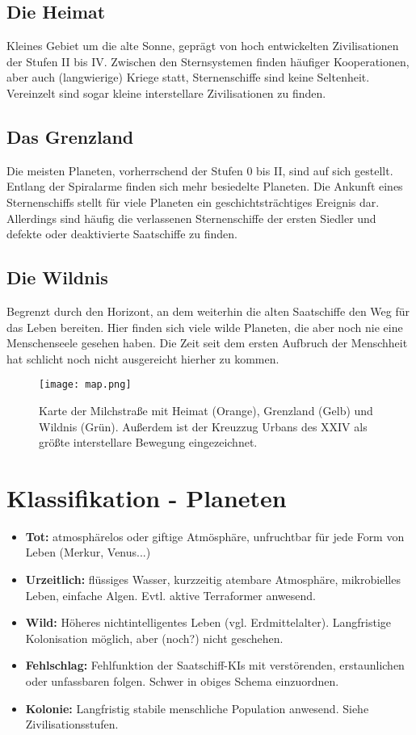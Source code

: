 \documentclass[10pt,a4paper]{report}
\begin{document}
\subsection*{Die Heimat}
Kleines Gebiet um die alte Sonne, geprägt von hoch entwickelten Zivilisationen der Stufen II bis IV. Zwischen den Sternsystemen finden häufiger Kooperationen, aber auch (langwierige) Kriege statt, Sternenschiffe sind keine Seltenheit. Vereinzelt sind sogar kleine interstellare Zivilisationen zu finden.
\subsection*{Das Grenzland}
Die meisten Planeten, vorherrschend der Stufen 0 bis II, sind auf sich gestellt. Entlang der Spiralarme finden sich mehr besiedelte Planeten. Die Ankunft eines Sternenschiffs stellt für viele Planeten ein geschichtsträchtiges Ereignis dar. Allerdings sind häufig die verlassenen Sternenschiffe der ersten Siedler und defekte oder deaktivierte Saatschiffe zu finden.
\subsection*{Die Wildnis}
Begrenzt durch den Horizont, an dem weiterhin die alten Saatschiffe den Weg für das Leben bereiten. Hier finden sich viele wilde Planeten, die aber noch nie eine Menschenseele gesehen haben. Die Zeit seit dem ersten Aufbruch der Menschheit hat schlicht noch nicht ausgereicht hierher zu kommen.

\begin{figure}[ht]
\centering
\texttt{[image: map.png]}
\caption{Karte der Milchstraße mit Heimat (Orange), Grenzland (Gelb) und Wildnis (Grün). Außerdem ist der Kreuzzug Urbans des XXIV als größte interstellare Bewegung eingezeichnet.}
\end{figure}

\section{Klassifikation - Planeten}
\begin{itemize}
\item \textbf{Tot:} atmosphärelos oder giftige Atmösphäre, unfruchtbar für jede Form von Leben (Merkur, Venus...)
\item \textbf{Urzeitlich:} flüssiges Wasser, kurzzeitig atembare Atmosphäre, mikrobielles Leben, einfache Algen. Evtl. aktive Terraformer anwesend.
\item \textbf{Wild:} Höheres nichtintelligentes Leben (vgl. Erdmittelalter). Langfristige Kolonisation möglich, aber (noch?) nicht geschehen.
\item \textbf{Fehlschlag:} Fehlfunktion der Saatschiff-KIs mit verstörenden, erstaunlichen oder unfassbaren folgen. Schwer in obiges Schema  einzuordnen.
\item \textbf{Kolonie:} Langfristig stabile menschliche Population anwesend. Siehe Zivilisationsstufen.
\end{itemize}
\end{document}
